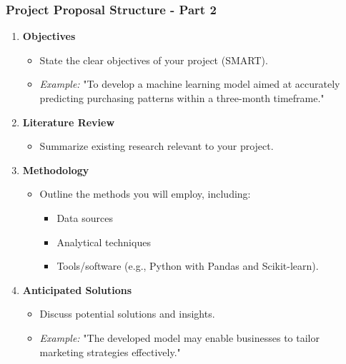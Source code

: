 \documentclass[aspectratio=169]{beamer}
\begin{document}
\begin{frame}[fragile]
  \frametitle{Project Proposal Structure - Part 2}
  \begin{enumerate}[resume] %
    \item \textbf{Objectives}
    \begin{itemize}
      \item State the clear objectives of your project (SMART).
      \item \textit{Example:} "To develop a machine learning model aimed at accurately predicting purchasing patterns within a three-month timeframe."
    \end{itemize}

    \item \textbf{Literature Review}
    \begin{itemize}
      \item Summarize existing research relevant to your project.
    \end{itemize}

    \item \textbf{Methodology}
    \begin{itemize}
      \item Outline the methods you will employ, including:
      \begin{itemize}
        \item Data sources
        \item Analytical techniques
        \item Tools/software (e.g., Python with Pandas and Scikit-learn).
      \end{itemize}
    \end{itemize}

    \item \textbf{Anticipated Solutions}
    \begin{itemize}
      \item Discuss potential solutions and insights.
      \item \textit{Example:} "The developed model may enable businesses to tailor marketing strategies effectively."
    \end{itemize}
  \end{enumerate}
\end{frame}
\end{document}
